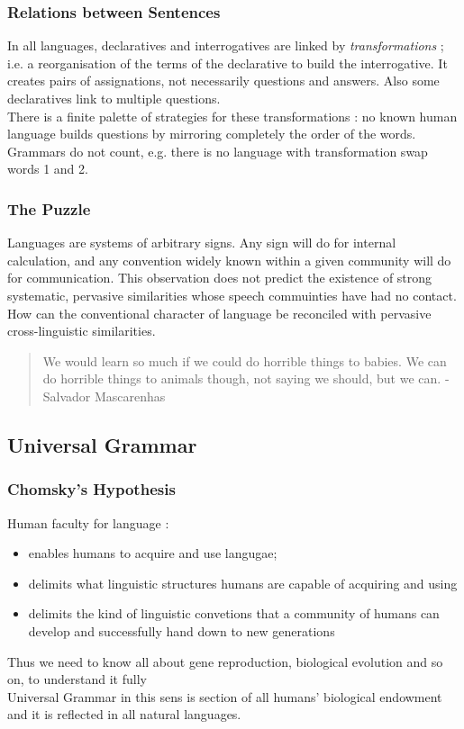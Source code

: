 \documentclass{cours}
\begin{document}
\subsubsection{Relations between Sentences}
In all languages, declaratives and interrogatives are linked by \emph{transformations} ; i.e. a reorganisation of the terms of the declarative to build the interrogative. It creates pairs of assignations, not necessarily questions and answers. Also some declaratives link to multiple questions. \\
There is a finite palette of strategies for these transformations\! : no known human language builds questions by mirroring completely the order of the words. Grammars do not count, e.g. there is no language with transformation swap words 1 and 2.\\

\subsubsection{The Puzzle}
Languages are systems of arbitrary signs. Any sign will do for internal calculation, and any convention widely known within a given community will do for communication. This observation does not predict the existence of strong systematic, pervasive similarities whose speech commuinties have had no contact. \\
How can the conventional character of language be reconciled with pervasive cross-linguistic similarities.
\begin{quote}
    We would learn so much if we could do horrible things to babies. We can do horrible things to animals though, not saying we should, but we can.   - Salvador Mascarenhas
\end{quote}

\subsection{Universal Grammar}
\subsubsection{Chomsky's Hypothesis}
Human faculty for language\! : \begin{itemize}
    \item enables humans to acquire and use langugae;
    \item delimits what linguistic structures humans are capable of acquiring and using
    \item delimits the kind of linguistic convetions that a community of humans can develop and successfully hand down to new generations
\end{itemize}
Thus we need to know all about gene reproduction, biological evolution and so on, to understand it fully \\
Universal Grammar in this sens is section of all humans' biological endowment and it is reflected in all natural languages.
\end{document}
